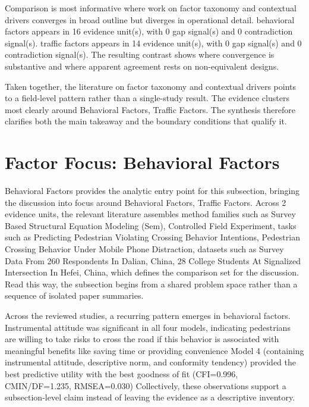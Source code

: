 \documentclass{article}
\begin{document}
Comparison is most informative where work on factor taxonomy and contextual drivers converges in broad outline but diverges in operational detail. behavioral factors appears in 16 evidence unit(s), with 0 gap signal(s) and 0 contradiction signal(s). traffic factors appears in 14 evidence unit(s), with 0 gap signal(s) and 0 contradiction signal(s). The resulting contrast shows where convergence is substantive and where apparent agreement rests on non-equivalent designs. \cite{09_2018_jiang_aap,12_2016_zhang_aap}

Taken together, the literature on factor taxonomy and contextual drivers points to a field-level pattern rather than a single-study result. The evidence clusters most clearly around Behavioral Factors, Traffic Factors. The synthesis therefore clarifies both the main takeaway and the boundary conditions that qualify it. \cite{09_2018_jiang_aap,12_2016_zhang_aap}

\section{Factor Focus: Behavioral Factors}
Behavioral Factors provides the analytic entry point for this subsection, bringing the discussion into focus around Behavioral Factors, Traffic Factors. Across 2 evidence units, the relevant literature assembles method families such as Survey Based Structural Equation Modeling (Sem), Controlled Field Experiment, tasks such as Predicting Pedestrian Violating Crossing Behavior Intentions, Pedestrian Crossing Behavior Under Mobile Phone Distraction, datasets such as Survey Data From 260 Respondents In Dalian, China, 28 College Students At Signalized Intersection In Hefei, China, which defines the comparison set for the discussion. Read this way, the subsection begins from a shared problem space rather than a sequence of isolated paper summaries. \cite{08_2016_zhou_aap,09_2018_jiang_aap}

Across the reviewed studies, a recurring pattern emerges in behavioral factors. Instrumental attitude was significant in all four models, indicating pedestrians are willing to take risks to cross the road if this behavior is associated with meaningful benefits like saving time or providing convenience Model 4 (containing instrumental attitude, descriptive norm, and conformity tendency) provided the best predictive utility with the best goodness of fit (CFI=0.996, CMIN/DF=1.235, RMSEA=0.030) Collectively, these observations support a subsection-level claim instead of leaving the evidence as a descriptive inventory. \cite{08_2016_zhou_aap,09_2018_jiang_aap}
\end{document}
